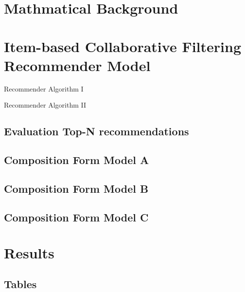 \section{Mathmatical Background}

\section{Item-based Collaborative Filtering Recommender Model}

\begin{algorithm}[H]
\begin{algorithmic}[1]

\end{algorithmic}
	\caption{Recommender Algorithm I}
	\label{Recommender_1}
\end{algorithm}

\begin{algorithm}[H]
\begin{algorithmic}[1]

\end{algorithmic}
\caption{Recommender Algorithm II}
\label{Recommender_1}
\end{algorithm}

\subsection{ Evaluation Top-N recommendations}


\subsection{Composition Form Model A}

\subsection{Composition Form Model B}

\subsection{Composition Form Model C}

\section{Results}

\subsection{Tables}

